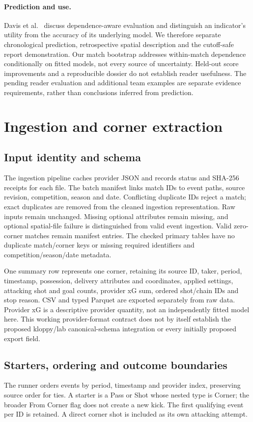 \documentclass[sigconf,nonacm]{acmart}
\begin{document}
\paragraph{Prediction and use.}
Davis et al.~\cite{davis2024} discuss dependence-aware evaluation and distinguish
an indicator's utility from the accuracy of its underlying model. We therefore
separate chronological prediction, retrospective spatial description and the
cutoff-safe report demonstration. Our match bootstrap addresses within-match
dependence conditionally on fitted models, not every source of uncertainty.
Held-out score improvements and a reproducible dossier do not establish reader
usefulness. The pending reader evaluation and additional team examples are
separate evidence requirements, rather than conclusions inferred from prediction.

\section{Ingestion and corner extraction}
\subsection{Input identity and schema}
The ingestion pipeline caches provider JSON and records status and SHA-256
receipts for each file. The batch manifest links match IDs to event paths, source
revision, competition, season and date. Conflicting duplicate IDs reject a match; exact
duplicates are removed from the cleaned ingestion representation. Raw inputs remain
unchanged. Missing optional attributes remain missing, and optional spatial-file
failure is distinguished from valid event ingestion. Valid zero-corner matches
remain manifest entries. The checked primary tables have no duplicate match/corner
keys or missing required identifiers and competition/season/date metadata.

One summary row represents one corner, retaining its source ID, taker, period,
timestamp, possession, delivery attributes and coordinates, applied settings,
attacking shot and goal counts, provider xG sum, ordered shot/chain IDs and stop
reason. CSV and typed Parquet are exported separately from raw data. Provider xG
is a descriptive provider quantity, not an independently fitted model here.
This working provider-format contract does not by itself establish the proposed
kloppy/lab canonical-schema integration or every initially proposed export field.

\subsection{Starters, ordering and outcome boundaries}
The runner orders events by period, timestamp and provider index, preserving source
order for ties. A starter is a Pass or Shot whose nested type is Corner; the broader
From Corner flag does not create a new kick. The first qualifying event per ID is
retained. A direct corner shot is included as its own attacking attempt.
\end{document}
